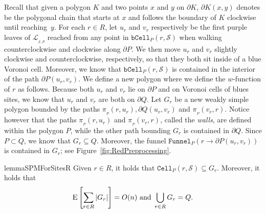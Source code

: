 \documentclass[a4paper, 11pt]{article}
\newcommand{\s}{\mathcal S}
\newcommand{\p}[3][P]{\ensuremath{\pi_{_{#1}}(#2, #3)}}
\newcommand{\funnel}[2][P]{\ensuremath{\mathtt{Funnel}_{\scriptscriptstyle #1}(#2)}}
\newcommand{\cell}[2][P]{\ensuremath{\mathtt{Cell}_{\scriptscriptstyle #1}(#2)}}
\newcommand{\bcell}[2][P]{\ensuremath{\mathtt{bCell}_{\scriptscriptstyle #1}(#2)}}
\newcommand{\ex}[1]{\textsc{E}\left[#1\right]}
\newcommand{\LL}[1][\s, P]{\ensuremath{\mathcal L_{_{#1}}}}
\begin{document}

Recall that given a polygon $K$ and two points $x$ and $y$ on $\partial K$, $\partial K(x,y)$ denotes be the polygonal chain that starts at $x$ and follows the boundary of $K$ clockwise until reaching~$y$.
For each $r\in R$, let $u_r$ and $v_r$ respectively be the first purple leaves of $\LL$ reached from any point in $\bcell{r, \s}$ when walking counterclockwise and clockwise along $\partial P$. 
We then move $u_r$ and $v_r$ slightly clockwise and counterclockwise, respectively, so that they both sit inside of a blue Voronoi cell. 
Moreover, we know that $\bcell{r,\s}$ is contained in the interior of the path $\partial P(u_r,v_r)$. 
We define a new polygon where we define the $w$-function of $r$ as follows.
Because both $u_r$ and $v_r$ lie on $\partial P$ and on Voronoi cells of blues sites, we know that $u_r$ and $v_r$ are both on $\partial Q$. 
Let $G_r$ be a new weakly simple polygon bounded by the paths $\p{r}{u_r}, \partial Q(u_r, v_r)$ and $\p{v_r}{r}$. 
Notice however that the paths $\p{r}{u_r}$ and $\p{v_r}{r}$, called the \emph{walls}, are defined within the polygon $P$, while the other path bounding $G_r$ is contained in $\partial Q$. 
Since $P\subset Q$, we know that $G_r\subseteq Q$. 
Moreover, the funnel $\funnel{r\to \partial P(u_r, v_r)}$ is contained in $G_r$; see Figure~\ref{fig:RedPreprocessing}.

\begin{restatable}{lemma}{SPMForSitesR}\label{lemma:SPMForSitesR}
Given $r\in R$, it holds that $\cell{r, \s}\subseteq G_r$. 
Moreover, it holds that 
\[ \ex{\sum_{r\in R} |G_r|} = O(n)\text{ and }\bigcup_{r\in R} G_r = Q.\]
\end{restatable}
\end{document}
